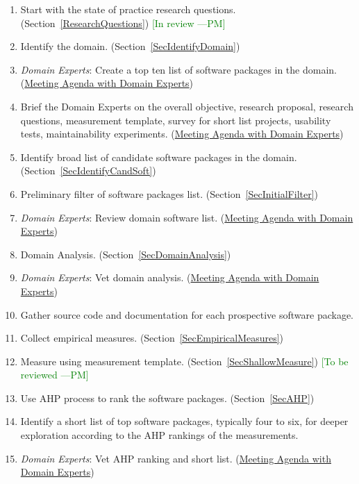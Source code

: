 \documentclass[letterpaper,cleveref]{lipics-v2019}
\newcommand{\authornote}[3]{\textcolor{#1}{[#3 ---#2]}}
\newcommand{\authornote}[3]{}
\newcommand{\pmi}[1]{\authornote{green}{PM}{#1}} %
\theoremstyle{definition}
\begin{document}
\begin{enumerate}
\item Start with the state of practice research questions. (Section~\ref{ResearchQuestions}) \pmi{In review}
\item Identify the domain. (Section~\ref{SecIdentifyDomain})
\item \emph{Domain Experts}: Create a top ten list of software packages in the domain. (\href{https://github.com/smiths/AIMSS/blob/master/StateOfPractice/Methodology/Meeting Agenda withmDomainmExperts.pdf}{Meeting Agenda with Domain Experts})
\item Brief the Domain Experts on the overall objective, research proposal, research questions, measurement template, survey for short list projects, usability tests, maintainability experiments. (\href{https://github.com/smiths/AIMSS/blob/master/StateOfPractice/Methodology/Meeting Agenda withmDomainmExperts.pdf}{Meeting Agenda with Domain Experts})
\item Identify broad list of candidate software packages in the domain. (Section~\ref{SecIdentifyCandSoft})
\item Preliminary filter of software packages list. (Section~\ref{SecInitialFilter})
\item \emph{Domain Experts}: Review domain software list. (\href{https://github.com/smiths/AIMSS/blob/master/StateOfPractice/Methodology/Meeting Agenda withmDomainmExperts.pdf}{Meeting Agenda with Domain Experts})
\item Domain Analysis. (Section~\ref{SecDomainAnalysis})
\item \emph{Domain Experts}: Vet domain analysis. (\href{https://github.com/smiths/AIMSS/blob/master/StateOfPractice/Methodology/Meeting Agenda withmDomainmExperts.pdf}{Meeting Agenda with Domain Experts}) 
\item Gather source code and documentation for each prospective software package.
\item Collect empirical measures. (Section~\ref{SecEmpiricalMeasures})
\item Measure using measurement template. (Section~\ref{SecShallowMeasure}) \pmi{To be reviewed}
\item Use AHP process to rank the software packages. (Section~\ref{SecAHP})
\item Identify a short list of top software packages, typically four to six, for deeper exploration according to the AHP rankings of the measurements.
\item \emph{Domain Experts}: Vet AHP ranking and short list. (\href{https://github.com/smiths/AIMSS/blob/master/StateOfPractice/Methodology/Meeting Agenda withmDomainmExperts.pdf}{Meeting Agenda with Domain Experts})

\end{enumerate}
\end{document}
